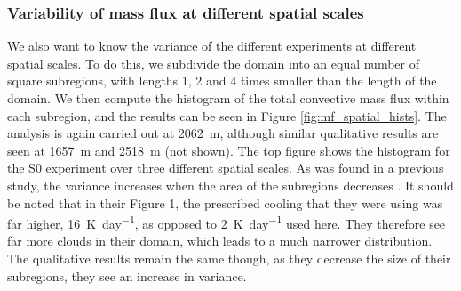 \documentclass[11pt,a4paper]{article}
\newcommand\todo[1]{\textbf{TODO: #1}}
\begin{document}
%
\subsubsection{Variability of mass flux at different spatial scales}
We also want to know the variance of the different experiments at different spatial scales. To do this, we subdivide the domain into an equal number of square subregions, with lengths 1, 2 and 4 times smaller than the length of the domain. We then compute the histogram of the total convective mass flux within each subregion, and the results can be seen in Figure \ref{fig:mf_spatial_hists}. The analysis is again carried out at \SI{2062}{m}, although similar qualitative results are seen at \SI{1657}{m} and \SI{2518}{m} (not shown). The top figure shows the histogram for the S0 experiment over three different spatial scales. As was found in a previous study, the variance increases when the area of the subregions decreases \parencite{PC2008}. It should be noted that in their Figure 1, the prescribed cooling that they were using was far higher, \SI{16}{K.day^{-1}}, as opposed to \SI{2}{K.day^{-1}} used here. They therefore see far more clouds in their domain, which leads to a much narrower distribution. The qualitative results remain the same though, as they decrease the size of their subregions, they see an increase in variance.
\end{document}
